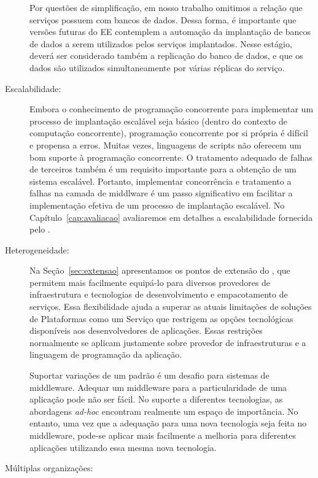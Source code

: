 \begin{description}
Por questões de simplificação, em nosso trabalho omitimos a relação que serviços possuem com bancos de dados.
Dessa forma, é importante que versões futuras do EE contemplem a automação da implantação de bancos de dados
a serem utilizados pelos serviços implantados. Nesse estágio, deverá ser considerado também a replicação
do banco de dados, e que os dados são utilizados simultaneamente por várias réplicas do serviço.

\item [Escalabilidade:]

Embora o conhecimento de programação concorrente para implementar
um processo de implantação escalável seja básico (dentro do contexto de computação concorrente),
programação concorrente por si própria é difícil e propensa a erros.
Muitas vezes, linguagens de scripts não oferecem um bom suporte à programação concorrente.
O tratamento adequado de falhas de terceiros também é um requisito importante
para a obtenção de um sistema escalável.
Portanto, implementar concorrência e tratamento a falhas na camada de middlware
é um passo significativo em facilitar a implementação efetiva de um
processo de implantação escalável.
No Capítulo~\ref{cap:avaliacao} avaliaremos em detalhes a escalabilidade fornecida pelo \ee.

\item [Heterogeneidade:]

Na Seção~\ref{sec:extensao} apresentamos os pontos de extensão do \ee,
que permitem mais facilmente equipá-lo para diversos provedores de infraestrutura
e tecnologias de desenvolvimento e empacotamento de serviços.
Essa flexibilidade ajuda a superar
as atuais limitações de soluções de Plataformas como um Serviço
que restrigem as opções tecnológicas disponíveis aos desenvolvedores de aplicações.
Essas restrições normalmente se aplicam justamente sobre
provedor de infraestruturas e a linguagem de programação da aplicação.

Suportar variações de um padrão é um desafio para sistemas de middleware.
Adequar um middleware para a particularidade de uma aplicação pode não ser fácil.
No suporte a diferentes tecnologias, as abordagens \emph{ad-hoc} encontram realmente um espaço de importância.
No entanto, uma vez que a adequação para uma nova tecnologia seja feita no middleware,
pode-se aplicar mais facilmente a melhoria para diferentes aplicações utilizando essa
mesma nova tecnologia.

\item [Múltiplas organizações:]


\end{description}
